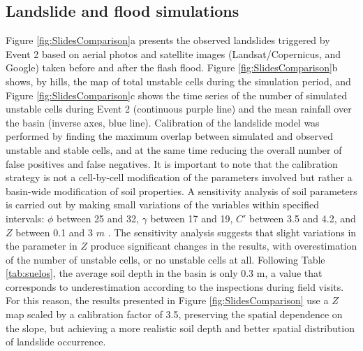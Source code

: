 \documentclass[hess, manuscript]{copernicus}
\begin{document}


\subsection{Landslide and flood simulations}

Figure \ref{fig:SlidesComparison}a presents the observed landslides triggered by Event 2  based on aerial photos and satellite images (Landsat/Copernicus, and Google) taken before and after the flash flood.  Figure \ref{fig:SlidesComparison}b shows,  by hills, the map of total unstable cells during the simulation period, and Figure \ref{fig:SlidesComparison}c shows the time series of the number of simulated unstable cells during Event 2 (continuous purple line) and the mean rainfall over the basin (inverse axes, blue line). Calibration of the landslide model was performed by finding the maximum overlap between simulated and observed unstable and stable cells, and at the same time reducing the overall number of false positives and false negatives. It is important to note that the calibration strategy is not a cell-by-cell modification of the parameters involved but rather a basin-wide modification of soil properties. A sensitivity analysis of soil parameters is carried out by making small variations of the variables within specified intervals: $\phi$ between 25 and 32, $\gamma$ between 17 and 19,  $C'$ between 3.5 and 4.2, and $Z$ between 0.1 and 3 $m$ . The sensitivity analysis suggests that slight variations in the parameter in $Z$ produce significant changes in the results, with overestimation of the number of unstable cells, or no unstable cells at all. Following Table \ref{tab:suelos}, the average soil depth in the basin is only 0.3 m, a value that corresponds to underestimation according to the inspections during field visits. For this reason, the results presented in Figure \ref{fig:SlidesComparison} use a  $Z$ map scaled by a calibration factor of 3.5, preserving the spatial dependence on the slope, but achieving a more realistic soil depth and better spatial distribution of landslide occurrence.\\ 
\end{document}
